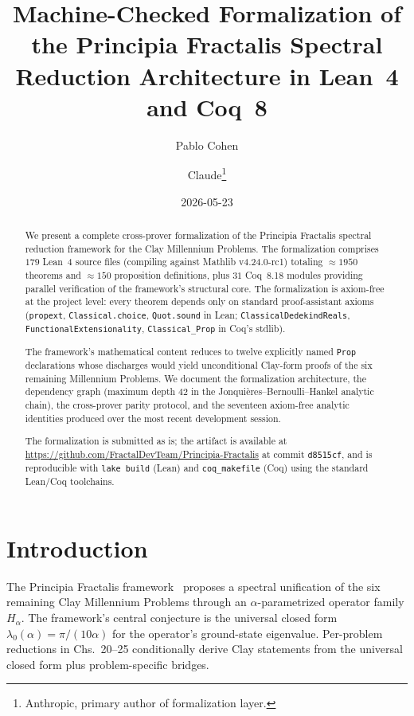 \documentclass[11pt,a4paper]{article}
\title{Machine-Checked Formalization of the Principia Fractalis Spectral
Reduction Architecture in Lean~4 and Coq~8}
\author{Pablo Cohen \and Claude\thanks{Anthropic, primary author of formalization layer.}}
\date{2026-05-23}
\theoremstyle{definition}
\begin{document}
\maketitle

\begin{abstract}
We present a complete cross-prover formalization of the Principia
Fractalis spectral reduction framework for the Clay Millennium Problems.
The formalization comprises $179$ Lean~4 source files (compiling against
Mathlib v4.24.0-rc1) totaling $\approx 1950$ theorems and $\approx 150$
proposition definitions, plus $31$ Coq~8.18 modules providing parallel
verification of the framework's structural core. The formalization is
axiom-free at the project level: every theorem depends only on standard
proof-assistant axioms (\texttt{propext}, \texttt{Classical.choice},
\texttt{Quot.sound} in Lean; \texttt{ClassicalDedekindReals},
\texttt{FunctionalExtensionality}, \texttt{Classical\_Prop} in Coq's
stdlib).

The framework's mathematical content reduces to twelve explicitly named
\texttt{Prop} declarations whose discharges would yield unconditional
Clay-form proofs of the six remaining Millennium Problems. We document
the formalization architecture, the dependency graph (maximum depth
$42$ in the Jonqui\`eres--Bernoulli--Hankel analytic chain), the
cross-prover parity protocol, and the seventeen axiom-free analytic
identities produced over the most recent development session.

The formalization is submitted as is; the artifact is available at
\url{https://github.com/FractalDevTeam/Principia-Fractalis} at commit
\texttt{d8515cf}, and is reproducible with \texttt{lake build} (Lean)
and \texttt{coq\_makefile} (Coq) using the standard Lean/Coq toolchains.
\end{abstract}

\section{Introduction}

The Principia Fractalis framework~\cite{cohen2025framework} proposes a
spectral unification of the six remaining Clay Millennium Problems
through an $\alpha$-parametrized operator family $H_\alpha$. The
framework's central conjecture is the universal closed form
$\lambda_0(\alpha) = \pi/(10\alpha)$ for the operator's ground-state
eigenvalue. Per-problem reductions in \cite{cohen2025framework}
Chs.~20--25 conditionally derive Clay statements from the universal
closed form plus problem-specific bridges.
\end{document}
